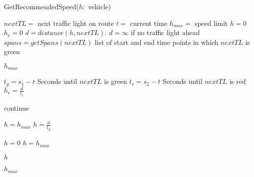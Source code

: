 \begin{algorithm}
\caption{GetRecommendedSpeed($h:$ vehicle)}\label{alg.recommendedSpeed}
\begin{algorithmic}[1]
\State $nextTL= $ next traffic light on route \label{alg:recSpeed:initStart}
\State $t=$ current time
\State $h_{max} = $ speed limit
\State $h = 0$
\State $h_r = 0$ 
\State $d=distance(h,nextTL)$. $d=\infty$ if no traffic light ahead\label{alg:recSpeed:initEnd}
\State $spans = getSpans(nextTL)$ \Comment list of start and end time points in which $nextTL$ is green

\Return $h_{max}$ \label{alg:recSpeed:maxSpeed}
\EndIf

\label{alg:recSpeed:loopSpans}
\State $t_g = s_1 - t$ \Comment Seconds until $nextTL$ is green \label{alg:recSpeed:tg}
\State $t_r = s_2 - t$ \Comment Seconds until $nextTL$ is red\label{alg:recSpeed:tr}
\State $h_r = \frac{d}{t_r}$\label{alg:recSpeed:hr}

\label{alg:recSpeed:continue}
\State continue
\EndIf

\label{alg:recSpeed:green}
\State $h=h_{max}$
\Else
\State $h = \frac{d}{t_g}$\label{alg:recSpeed:h}
\EndIf

\label{alg:recSpeed:h0} %
\State $h = 0$
\State $h=h_{max}$
\EndIf\label{alg:recSpeed:hmax}

\State\Return $h$\label{alg:recSpeed:returnh}
\EndFor

\State\Return $h_{max}$\label{alg:recSpeed:returnmax}

\end{algorithmic}
\end{algorithm}